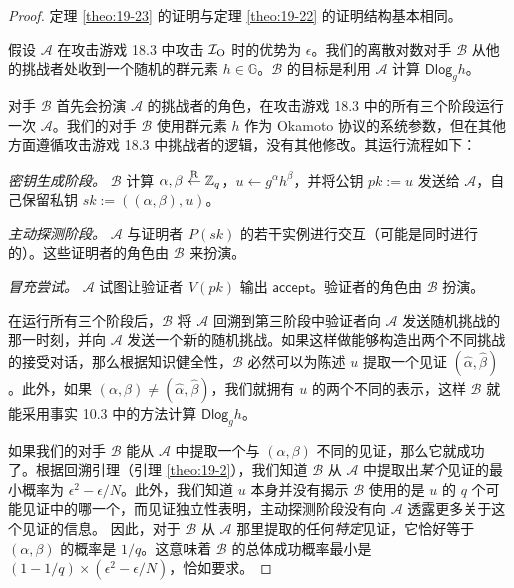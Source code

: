 \begin{proof}
定理 \ref{theo:19-23} 的证明与定理 \ref{theo:19-22} 的证明结构基本相同。

假设 $\mathcal{A}$ 在攻击游戏 18.3 中攻击 $\mathcal{I}_{\rm O}$ 时的优势为 $\epsilon$。我们的离散对数对手 $\mathcal{B}$ 从他的挑战者处收到一个随机的群元素 $h\in\mathbb{G}$。$\mathcal{B}$ 的目标是利用 $\mathcal{A}$ 计算 $\mathsf{Dlog}_gh$。

对手 $\mathcal{B}$ 首先会扮演 $\mathcal{A}$ 的挑战者的角色，在攻击游戏 18.3 中的所有三个阶段运行一次 $\mathcal{A}$。我们的对手 $\mathcal{B}$ 使用群元素 $h$ 作为 Okamoto 协议的系统参数，但在其他方面遵循攻击游戏 18.3 中挑战者的逻辑，没有其他修改。其运行流程如下：

\vspace*{5pt}

\emph{密钥生成阶段。}
$\mathcal{B}$ 计算 $\alpha,\beta\overset{\rm R}\leftarrow\mathbb{Z}_q$，$u\leftarrow g^\alpha h^\beta$，并将公钥 $pk:=u$ 发送给 $\mathcal{A}$，自己保留私钥 $sk:=((\alpha,\beta),u)$。

\vspace*{5pt}

\emph{主动探测阶段。}
$\mathcal{A}$ 与证明者 $P(sk)$ 的若干实例进行交互（可能是同时进行的）。这些证明者的角色由 $\mathcal{B}$ 来扮演。

\vspace*{5pt}

\emph{冒充尝试。}
$\mathcal{A}$ 试图让验证者 $V(pk)$ 输出 $\mathsf{accept}$。验证者的角色由 $\mathcal{B}$ 扮演。

\vspace*{5pt}

在运行所有三个阶段后，$\mathcal{B}$ 将 $\mathcal{A}$ 回溯到第三阶段中验证者向 $\mathcal{A}$ 发送随机挑战的那一时刻，并向 $\mathcal{A}$ 发送一个新的随机挑战。如果这样做能够构造出两个不同挑战的接受对话，那么根据知识健全性，$\mathcal{B}$ 必然可以为陈述 $u$ 提取一个见证 $(\hat\alpha,\hat\beta)$。此外，如果 $(\alpha,\beta)\neq(\hat\alpha,\hat\beta)$，我们就拥有 $u$ 的两个不同的表示，这样 $\mathcal{B}$ 就能采用事实 10.3 中的方法计算 $\mathsf{Dlog}_gh$。

如果我们的对手 $\mathcal{B}$ 能从 $\mathcal{A}$ 中提取一个与 $(\alpha,\beta)$ 不同的见证，那么它就成功了。根据回溯引理（引理 \ref{theo:19-2}），我们知道 $\mathcal{B}$ 从 $\mathcal{A}$ 中提取出\emph{某个}见证的最小概率为 $\epsilon^2-{\epsilon}/{N}$。此外，我们知道 $u$ 本身并没有揭示 $\mathcal{B}$ 使用的是 $u$ 的 $q$ 个可能见证中的哪一个，而见证独立性表明，主动探测阶段没有向 $\mathcal{A}$ 透露更多关于这个见证的信息。 因此，对于 $\mathcal{B}$ 从 $\mathcal{A}$ 那里提取的任何\emph{特定}见证，它恰好等于 $(\alpha,\beta)$ 的概率是 ${1}/{q}$。这意味着 $\mathcal{B}$ 的总体成功概率最小是 $(1-{1}/{q})\times(\epsilon^2-{\epsilon}/{N})$，恰如要求。
\end{proof}